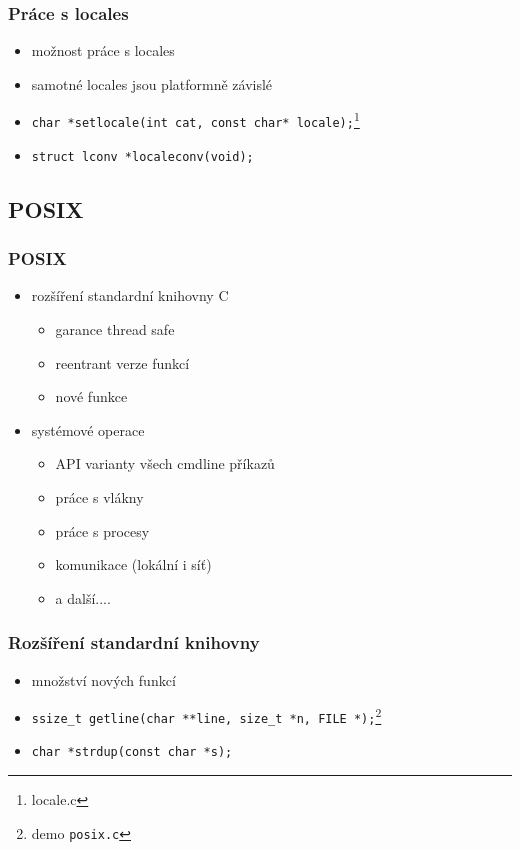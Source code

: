 \begin{frame}
	\frametitle{Práce s locales}
	\begin{itemize}
		\item{možnost práce s locales}
		\item{samotné locales jsou platformně závislé}
		\item{\texttt{char *setlocale(int cat, const char* locale);}\footnote{locale.c}}
		\item{\texttt{struct lconv *localeconv(void);}}
	\end{itemize}
\end{frame}

\subsection{POSIX}

\begin{frame}
	\frametitle{POSIX}
	\begin{itemize}
		\item{rozšíření standardní knihovny C}
		\begin{itemize}
			\item{garance thread safe}
			\item{reentrant verze funkcí}
			\item{nové funkce}
		\end{itemize}
		\item{systémové operace}
		\begin{itemize}
			\item{API varianty všech cmdline příkazů}
			\item{práce s vlákny}
			\item{práce s procesy}
			\item{komunikace (lokální i síť)}
			\item{a další....}
		\end{itemize}
	\end{itemize}
\end{frame}

\begin{frame}
	\frametitle{Rozšíření standardní knihovny}
	\begin{itemize}
		\item{množství nových funkcí}
		\item{\texttt{ssize\_t getline(char **line, size\_t *n, FILE *);}\footnote{demo \texttt{posix.c}}}
		\item{\texttt{char *strdup(const char *s);}}
	\end{itemize}
\end{frame}

